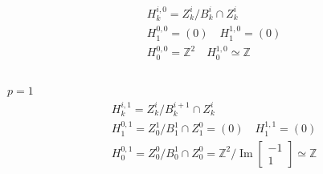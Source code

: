 \documentclass[11pt,a4paper]{report}
\DeclareMathOperator{\Ima}{Im}
\begin{document}
\begin{Ex}
\begin{align*}
                &H_k^{i,0} = Z_k^i / B_k^i \cap Z_k^i\\
                &H_1^{0,0} = (0) \quad H_1^{1,0} = (0)\\
                &H_0^{0,0} = \mathbb{Z}^2 \quad H_0^{1,0} \simeq \mathbb{Z}\\
              \end{align*}
              \\
              \underline{$p = 1$}
              \begin{align*}
                &H_k^{i,1} = Z_k^i / B_k^{i+1} \cap Z_k^i\\
                &H_1^{0,1} = Z_0^1 / B_1^{1} \cap Z_1^0 = (0) \quad H_1^{1,1} = (0)\\
                &H_0^{0,1} = Z_0^0 / B_0^{1} \cap Z_0^0 = \mathbb{Z}^2 / \Ima \begin{bmatrix}-1\\1\end{bmatrix} \simeq \mathbb{Z}\\
              \end{align*}
              \end{Ex}
\end{document}
